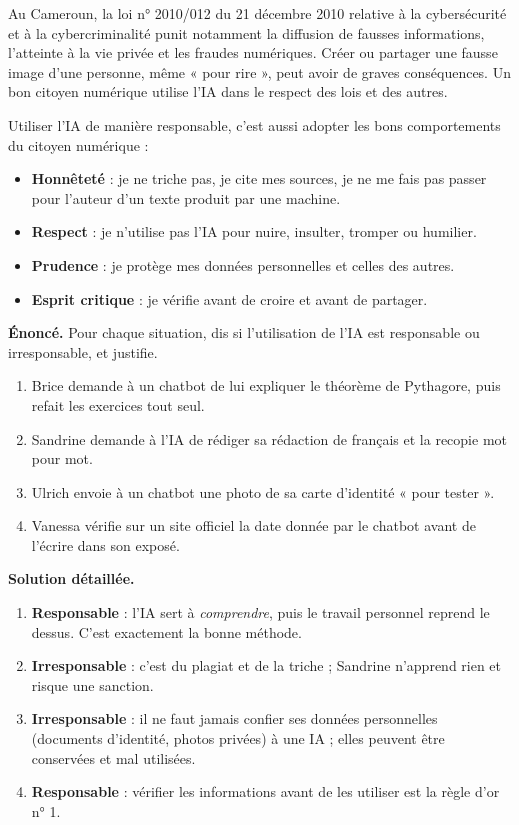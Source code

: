 \documentclass[11pt]{article}
\newcommand{\cle}[1]{{\popxbold\color{popdark}#1}}
\newcounter{popsec}
\newcounter{popsub}
\newcommand{\courssub}[1]{%
  \stepcounter{popsub}%
  \par\vspace{9pt}\noindent{\popxbold\fontsize{11.5}{13}\selectfont\color{popink}{\color{poporange}\thepopsec.\thepopsub}\hspace{6pt}#1}\par\nopagebreak\vspace{4pt}
}
\begin{document}
\begin{savaistu}[L'IA et la loi]
Au Cameroun, la loi n° 2010/012 du 21 décembre 2010 relative à la cybersécurité et à la cybercriminalité punit notamment la diffusion de fausses informations, l'atteinte à la vie privée et les fraudes numériques. Créer ou partager une fausse image d'une personne, même « pour rire », peut avoir de graves conséquences. Un bon citoyen numérique utilise l'IA dans le respect des lois et des autres.
\end{savaistu}

\courssub{Être un bon citoyen numérique}

Utiliser l'IA de manière responsable, c'est aussi adopter les bons comportements du \cle{citoyen numérique} :

\begin{itemize}
\item \textbf{Honnêteté} : je ne triche pas, je cite mes sources, je ne me fais pas passer pour l'auteur d'un texte produit par une machine.
\item \textbf{Respect} : je n'utilise pas l'IA pour nuire, insulter, tromper ou humilier.
\item \textbf{Prudence} : je protège mes données personnelles et celles des autres.
\item \textbf{Esprit critique} : je vérifie avant de croire et avant de partager.
\end{itemize}

\begin{exoresolu}
\textbf{Énoncé.} Pour chaque situation, dis si l'utilisation de l'IA est responsable ou irresponsable, et justifie.
\begin{enumerate}
\item Brice demande à un chatbot de lui expliquer le théorème de Pythagore, puis refait les exercices tout seul.
\item Sandrine demande à l'IA de rédiger sa rédaction de français et la recopie mot pour mot.
\item Ulrich envoie à un chatbot une photo de sa carte d'identité « pour tester ».
\item Vanessa vérifie sur un site officiel la date donnée par le chatbot avant de l'écrire dans son exposé.
\end{enumerate}
\tcblower
\textbf{Solution détaillée.}
\begin{enumerate}
\item \textbf{Responsable} : l'IA sert à \emph{comprendre}, puis le travail personnel reprend le dessus. C'est exactement la bonne méthode.
\item \textbf{Irresponsable} : c'est du plagiat et de la triche ; Sandrine n'apprend rien et risque une sanction.
\item \textbf{Irresponsable} : il ne faut jamais confier ses données personnelles (documents d'identité, photos privées) à une IA ; elles peuvent être conservées et mal utilisées.
\item \textbf{Responsable} : vérifier les informations avant de les utiliser est la règle d'or n° 1.
\end{enumerate}
\end{exoresolu}
\end{document}
